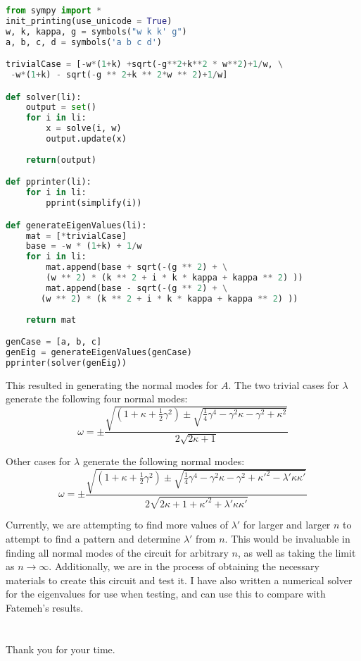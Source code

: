 \documentclass[11pt]{article}
\begin{document}
\begin{lstlisting}[language=Python]
from sympy import *
init_printing(use_unicode = True)
w, k, kappa, g = symbols("w k k' g")
a, b, c, d = symbols('a b c d')

trivialCase = [-w*(1+k) +sqrt(-g**2+k**2 * w**2)+1/w, \
 -w*(1+k) - sqrt(-g ** 2+k ** 2*w ** 2)+1/w]

def solver(li):
    output = set()
    for i in li:
        x = solve(i, w)
        output.update(x)
    
    return(output)

def pprinter(li):
    for i in li:
        pprint(simplify(i))

def generateEigenValues(li):
    mat = [*trivialCase]
    base = -w * (1+k) + 1/w
    for i in li:
        mat.append(base + sqrt(-(g ** 2) + \
        (w ** 2) * (k ** 2 + i * k * kappa + kappa ** 2) ))
        mat.append(base - sqrt(-(g ** 2) + \
       (w ** 2) * (k ** 2 + i * k * kappa + kappa ** 2) ))
    
    return mat

genCase = [a, b, c]
genEig = generateEigenValues(genCase)
pprinter(solver(genEig))
\end{lstlisting}

This resulted in generating the normal modes for $A$. The two trivial cases for $\lambda$ generate the following four normal modes:
\[
\omega = \pm \frac{\sqrt{(1+\kappa+\frac{1}{2}\gamma^2) \pm \sqrt{\frac{1}{4}\gamma^4 - \gamma^2 \kappa - \gamma^2 + \kappa^2}}}{2 \sqrt{2\kappa + 1}}
\]

Other cases for $\lambda$ generate the following normal modes:
\[
\omega = \pm \frac{\sqrt{(1 + \kappa + \frac{1}{2}\gamma^2) \pm \sqrt{\frac{1}{4}\gamma^4 - \gamma^2 \kappa - \gamma^2 + \kappa'^2 - \lambda' \kappa \kappa'}}}{2 \sqrt{2\kappa + 1 + \kappa'^2 + \lambda' \kappa \kappa'}}
\]

Currently, we are attempting to find more values of $\lambda'$ for larger and larger $n$ to attempt to find a pattern and determine $\lambda'$ from $n$. This would be invaluable in finding all normal modes of the circuit for arbitrary $n$, as well as taking the limit as $n \to \infty$. Additionally, we are in the process of obtaining the necessary materials to create this circuit and test it. I have also written a numerical solver for the eigenvalues for use when testing, and can use this to compare with Fatemeh's results.
\\
\\
\\
Thank you for your time.
\end{document}
